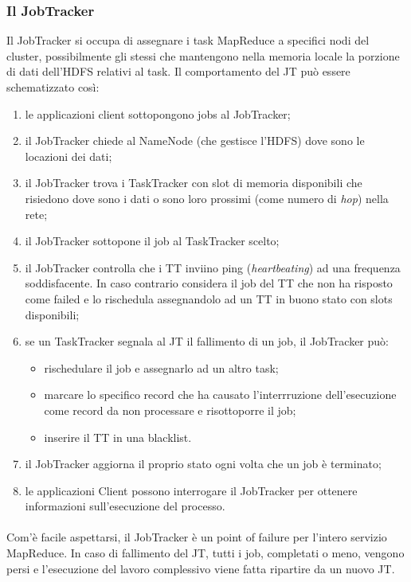 \documentclass[a4paper,11pt]{report}
\begin{document}
\subsubsection{Il JobTracker}
Il JobTracker si occupa di assegnare i task MapReduce a specifici nodi del cluster, possibilmente gli stessi che mantengono nella memoria
locale la porzione di dati dell'HDFS
relativi al task. Il comportamento del JT può essere schematizzato così:
\begin{enumerate}
 \item le applicazioni client sottopongono jobs al JobTracker;
 \item il JobTracker chiede al NameNode (che gestisce l'HDFS) dove sono le locazioni dei dati;
 \item il JobTracker trova i TaskTracker con slot di memoria disponibili che risiedono dove sono i dati o sono loro prossimi (come numero di
\emph{hop}) nella rete;
 \item il JobTracker sottopone il job al TaskTracker scelto;
 \item il JobTracker controlla che i TT inviino ping (\emph{heartbeating}) ad una frequenza soddisfacente. In caso contrario considera il
job del TT che non ha risposto come
failed e lo rischedula assegnandolo ad un TT in buono stato con slots disponibili;
 \item se un TaskTracker segnala al JT il fallimento di un job, il JobTracker può:
  \begin{itemize}
   \item rischedulare il job e assegnarlo ad un altro task;
   \item marcare lo specifico record che ha causato l'interrruzione dell'esecuzione come record da non processare e risottoporre il job;
   \item inserire il TT in una blacklist.
  \end{itemize}
 \item il JobTracker aggiorna il proprio stato ogni volta che un job è terminato;
 \item le applicazioni Client possono interrogare il JobTracker per ottenere informazioni sull'esecuzione del processo.
\end{enumerate}
\paragraph{}
Com'è facile aspettarsi, il JobTracker è un point of failure per l'intero servizio MapReduce. In caso di fallimento del JT, tutti i job,
completati o meno, vengono persi e 
l'esecuzione del lavoro complessivo viene fatta ripartire da un nuovo JT.
\end{document}
